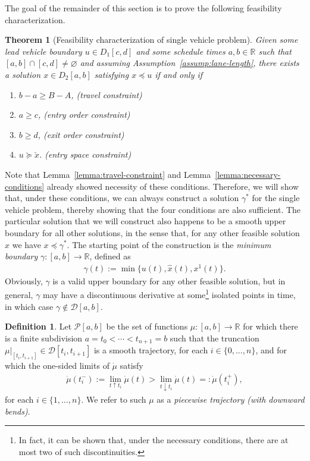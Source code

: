 \documentclass[a4paper]{report}
\theoremstyle{definition}
\newtheorem{define}{Definition}[chapter]
\theoremstyle{plain}
\newtheorem{theorem}{Theorem}[chapter]
\begin{document}
The goal of the remainder of this section is to prove the following feasibility
characterization.

\begin{theorem}[Feasibility characterization of single vehicle
  problem]\label{thm:single-vehicle}
  Given some lead vehicle boundary $u \in D_{1}[c,d]$ and some schedule times
  $a, b \in \mathbb{R}$ such that $[a,b]\cap [c,d] \neq \varnothing$ and assuming
  Assumption~\ref{assump:lane-length}, there exists a solution
  $x \in D_{2}[a,b]$ satisfying $x \preceq u$ if and only if \TabPositions{3cm}
  \begin{enumerate}[label=(\roman*)\quad,leftmargin=5em,midpenalty=5]
    \item $b-a \geq B-A$, \tab (travel constraint)
    \item $a \geq c$, \tab (entry order constraint)
    \item $b \geq d$, \tab (exit order constraint)
    \item $u \succeq \check{x}$. \tab (entry space constraint)
  \end{enumerate}
\end{theorem}

Note that Lemma~\ref{lemma:travel-constraint} and Lemma~\ref{lemma:necessary-conditions} already showed
necessity of these conditions.
%
Therefore, we will show that, under these conditions, we can always construct a
solution $\gamma^{*}$ for the single vehicle problem, thereby showing that the
four conditions are also sufficient.
%
The particular solution that we will construct also happens to be a smooth upper
boundary for all other solutions, in the sense that, for any other feasible
solution $x$ we have $x \preceq \gamma^{*}$.
%
The starting point of the construction is the \emph{minimum boundary}
$\gamma : [a,b] \rightarrow \mathbb{R}$, defined as
\begin{align}\label{eq:min-boundary}
  \gamma(t) := \min \{ u(t), \hat{x}(t), x^{1}(t) \} .
\end{align}
%
Obviously, $\gamma$ is a valid upper boundary for any other feasible solution,
%
but in general, $\gamma$ may have a discontinuous derivative at some\footnote{In fact, it can be shown that, under the necessary conditions, there are at most two of such discontinuities.} isolated
points in time, in which case $\gamma \notin \mathcal{D}[a,b]$.

\begin{define}\label{def:piecewise-trajectory}
  Let $\mathcal{P}[a,b]$ be the set of functions $\mu : [a, b] \rightarrow \mathbb{R}$ for
  which there is a finite subdivision $a = t_{0} < \cdots < t_{n+1} = b$ such that
  the truncation $\mu|_{[t_{i}, t_{i+1}]} \in \mathcal{D}[t_{i}, t_{i+1}]$ is
  a smooth trajectory, for each $i \in \{0, \dots, n\}$, and for which the one-sided limits of $\dot{\mu}$ satisfy
  \begin{align}
    \dot{\mu}(t_{i}^{-}) := \lim_{t \uparrow t_{i}} \dot{\mu}(t) > \lim_{t \downarrow t_{i}} \dot{\mu}(t) =: \dot{\mu}(t_{i}^{+}) ,
  \end{align}
  for each $i \in \{1, \dots, n\}$. We refer to such $\mu$ as a \emph{piecewise
    trajectory (with downward bends)}.
\end{define}
\end{document}
